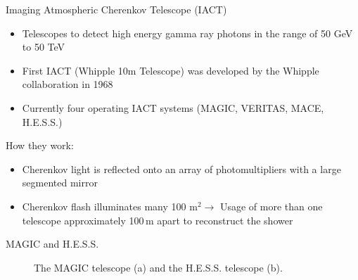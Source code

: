 \documentclass[aspectratio=1610, 10pt]{beamer}
\begin{document}
\begin{frame}{Imaging Atmospheric Cherenkov Telescope (IACT)}
  \begin{itemize}
    \item Telescopes to detect high energy gamma ray photons in the range of 50 GeV to 50 TeV
    \medskip
    \item First IACT (Whipple 10m Telescope) was developed by the Whipple collaboration in 1968
    \medskip
    \item Currently four operating IACT systems (MAGIC, VERITAS, MACE, H.E.S.S.)
  \end{itemize}
\vspace{0.5cm}
How they work:
\begin{itemize}
  \item Cherenkov light is reflected onto an array of photomultipliers with a large segmented mirror
  \medskip
  \item Cherenkov flash illuminates many 100 $\mathrm{m}^2 \rightarrow$ Usage of more than one telescope approximately 100$\, \mathrm{m}$ apart to
  reconstruct the shower
\end{itemize}
\end{frame}



\begin{frame}{MAGIC and H.E.S.S.}
  \begin{figure}
      \hspace{0.5cm}
  \caption{ The MAGIC telescope (a) and the H.E.S.S. telescope (b).}
  \end{figure}
\end{frame}
\end{document}

